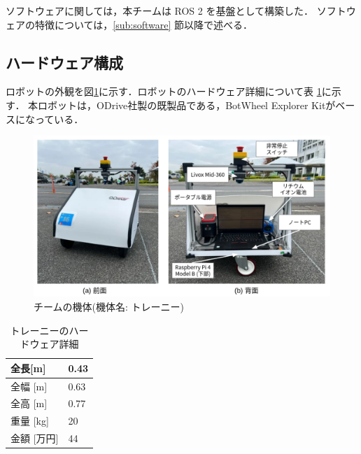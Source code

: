 \documentclass[twocolumn,9pt]{jsproceedings}
\begin{document}
ソフトウェアに関しては，本チームは ROS 2 \cite{ROS 2} を基盤として構築した．
ソフトウェアの特徴については，\ref{sub:software} 節以降で述べる．


\subsection{ハードウェア構成}\label{sub:hardware}
ロボットの外観を図\ref{fig:trainee}に示す．ロボットのハードウェア詳細について表
\ref{table:tarainee_hardware_syousai}に示す．
本ロボットは，ODrive社製の既製品である，BotWheel Explorer Kit\cite{odrive}がベースになっている．

\begin{figure}[h]
  \begin{center}
    \includegraphics[width=1.0\linewidth]{figs/trainee.pdf}
    \caption{チームの機体(機体名: トレーニー)}
    \label{fig:trainee}
  \end{center}
\end{figure}

\begin{table}[H]
  \centering
  \caption{トレーニーのハードウェア詳細}
  \label{table:tarainee_hardware_syousai}
	  \begin{tabular}{|p{3.0cm}|l|}
    \hline
    全長[m] & 0.43\\ 
    \hline
    全幅 [m] & 0.63 \\ 
    \hline
    全高 [m] & 0.77 \\ 
    \hline
    重量 [kg] & 20 \\ 
    \hline
    金額 [万円] & 44 \\ 
    \hline
  \end{tabular}
\end{table}
\end{document}
